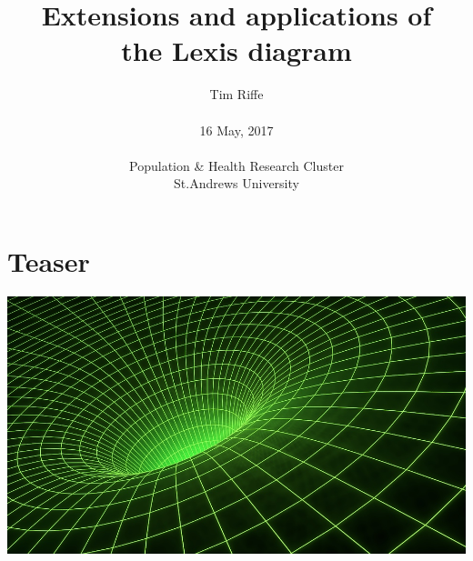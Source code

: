 \documentclass[20pt]{beamer}
\title{Extensions and applications of \\ the Lexis diagram}
\subtitle{Tim Riffe \\ \\ \small{16 May, 2017}\\ \\ \small{Population \& Health
Research Cluster}\\ \small{St.Andrews University}}
\begin{document}

\begin{frame}
	\titlepage
\end{frame}


\section{Teaser}

\begin{frame}
\vspace{-15em}
\begin{center}
\vspace{4.25cm}
\hspace*{-6cm}\includegraphics[scale=1]{Figures/spacegrid.jpg}
\end{center}
\end{frame}
%
\end{document}
